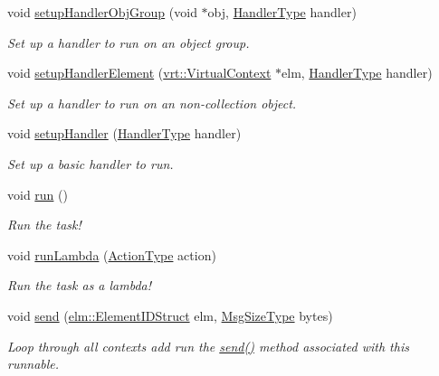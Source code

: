 \begin{DoxyCompactItemize}
void \hyperlink{structvt_1_1runnable_1_1_runnable_new_abad781e1e7a4a58d00c6c0dd3a44d105}{setup\+Handler\+Obj\+Group} (void $\ast$obj, \hyperlink{namespacevt_af64846b57dfcaf104da3ef6967917573}{Handler\+Type} handler)
\begin{DoxyCompactList}\small\item\em Set up a handler to run on an object group. \end{DoxyCompactList}\item 
void \hyperlink{structvt_1_1runnable_1_1_runnable_new_aeaec7cf81fe97f2d6b57f35dbd408b5e}{setup\+Handler\+Element} (\hyperlink{structvt_1_1vrt_1_1_virtual_context}{vrt\+::\+Virtual\+Context} $\ast$elm, \hyperlink{namespacevt_af64846b57dfcaf104da3ef6967917573}{Handler\+Type} handler)
\begin{DoxyCompactList}\small\item\em Set up a handler to run on an non-\/collection object. \end{DoxyCompactList}\item 
void \hyperlink{structvt_1_1runnable_1_1_runnable_new_ab95b9552fe304366b21421ded2b795dc}{setup\+Handler} (\hyperlink{namespacevt_af64846b57dfcaf104da3ef6967917573}{Handler\+Type} handler)
\begin{DoxyCompactList}\small\item\em Set up a basic handler to run. \end{DoxyCompactList}\item 
void \hyperlink{structvt_1_1runnable_1_1_runnable_new_a3fa6c8ee2214c074c748000f782ad793}{run} ()
\begin{DoxyCompactList}\small\item\em Run the task! \end{DoxyCompactList}\item 
void \hyperlink{structvt_1_1runnable_1_1_runnable_new_acc279e407e94d28355b982f6c6adc67b}{run\+Lambda} (\hyperlink{namespacevt_ae0a5a7b18cc99d7b732cb4d44f46b0f3}{Action\+Type} action)
\begin{DoxyCompactList}\small\item\em Run the task as a lambda! \end{DoxyCompactList}\item 
void \hyperlink{structvt_1_1runnable_1_1_runnable_new_aa7e06ec59e7376d1d01dfa6ab9a9563b}{send} (\hyperlink{structvt_1_1elm_1_1_element_i_d_struct}{elm\+::\+Element\+I\+D\+Struct} elm, \hyperlink{namespacevt_a408e86a8c7c89309b52907dc5a513924}{Msg\+Size\+Type} bytes)
\begin{DoxyCompactList}\small\item\em Loop through all contexts add run the {\ttfamily \hyperlink{structvt_1_1runnable_1_1_runnable_new_aa7e06ec59e7376d1d01dfa6ab9a9563b}{send()}} method associated with this runnable. \end{DoxyCompactList}\item 

\end{DoxyCompactItemize}
